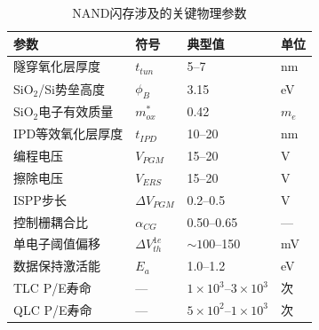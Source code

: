 \documentclass[11pt,a4paper,twoside]{article}
\theoremstyle{definition}
\theoremstyle{plain}
\theoremstyle{remark}
\begin{document}
\begin{table}[H]
\centering
\caption{NAND闪存涉及的关键物理参数}
\begin{tabular}{@{}llll@{}}
\toprule
参数 & 符号 & 典型值 & 单位 \\
\midrule
隧穿氧化层厚度 & $t_{tun}$ & 5--7 & nm \\
SiO$_2$/Si势垒高度 & $\phi_B$ & 3.15 & eV \\
SiO$_2$电子有效质量 & $m_{ox}^*$ & 0.42 & $m_e$ \\
IPD等效氧化层厚度 & $t_{IPD}$ & 10--20 & nm \\
编程电压 & $V_{PGM}$ & 15--20 & V \\
擦除电压 & $V_{ERS}$ & 15--20 & V \\
ISPP步长 & $\Delta V_{PGM}$ & 0.2--0.5 & V \\
控制栅耦合比 & $\alpha_{CG}$ & 0.50--0.65 & — \\
单电子阈值偏移 & $\Delta V_{th}^{1e}$ & $\sim 100$--150 & mV \\
数据保持激活能 & $E_a$ & 1.0--1.2 & eV \\
TLC P/E寿命 & — & $1\times 10^3$--$3\times 10^3$ & 次 \\
QLC P/E寿命 & — & $5\times 10^2$--$1\times 10^3$ & 次 \\
\bottomrule
\end{tabular}
\end{table}
\end{document}
